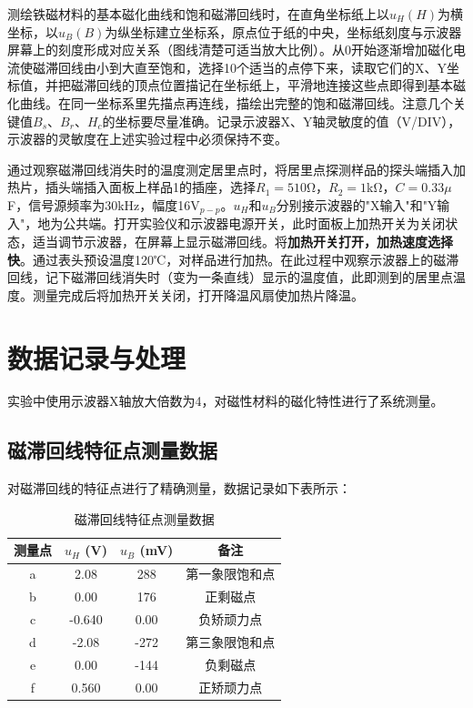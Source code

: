 ﻿\documentclass[12pt,a4paper]{article}
\begin{document}
测绘铁磁材料的基本磁化曲线和饱和磁滞回线时，在直角坐标纸上以$u_H(H)$为横坐标，以$u_B(B)$为纵坐标建立坐标系，原点位于纸的中央，坐标纸刻度与示波器屏幕上的刻度形成对应关系（图线清楚可适当放大比例）。从0开始逐渐增加磁化电流使磁滞回线由小到大直至饱和，选择10个适当的点停下来，读取它们的X、Y坐标值，并把磁滞回线的顶点位置描记在坐标纸上，平滑地连接这些点即得到基本磁化曲线。在同一坐标系里先描点再连线，描绘出完整的饱和磁滞回线。注意几个关键值$B_s$、$B_r$、$H_c$的坐标要尽量准确。记录示波器X、Y轴灵敏度的值（V/DIV），示波器的灵敏度在上述实验过程中必须保持不变。

通过观察磁滞回线消失时的温度测定居里点时，将居里点探测样品的探头端插入加热片，插头端插入面板上样品1的插座，选择$R_1 = 510$Ω，$R_2 = 1$kΩ，$C=0.33\mu$F，信号源频率为30kHz，幅度16V$_{p-p}$。$u_H$和$u_B$分别接示波器的"X输入"和"Y输入"，地为公共端。打开实验仪和示波器电源开关，此时面板上加热开关为关闭状态，适当调节示波器，在屏幕上显示磁滞回线。将\textbf{加热开关打开，加热速度选择快}。通过表头预设温度120℃，对样品进行加热。在此过程中观察示波器上的磁滞回线，记下磁滞回线消失时（变为一条直线）显示的温度值，此即测到的居里点温度。测量完成后将加热开关关闭，打开降温风扇使加热片降温。

\section{数据记录与处理}

实验中使用示波器X轴放大倍数为4，对磁性材料的磁化特性进行了系统测量。

\subsection{磁滞回线特征点测量数据}

对磁滞回线的特征点进行了精确测量，数据记录如下表所示：

\begin{table}[H]
\centering
\caption{磁滞回线特征点测量数据}
\begin{tabular}{|c|c|c|c|}
\hline
测量点 & $u_H$ (V) & $u_B$ (mV) & 备注 \\
\hline
a & 2.08 & 288 & 第一象限饱和点 \\
\hline
b & 0.00 & 176 & 正剩磁点 \\
\hline
c & -0.640 & 0.00 & 负矫顽力点 \\
\hline
d & -2.08 & -272 & 第三象限饱和点 \\
\hline
e & 0.00 & -144 & 负剩磁点 \\
\hline
f & 0.560 & 0.00 & 正矫顽力点 \\
\hline
\end{tabular}
\end{table}
\end{document}

